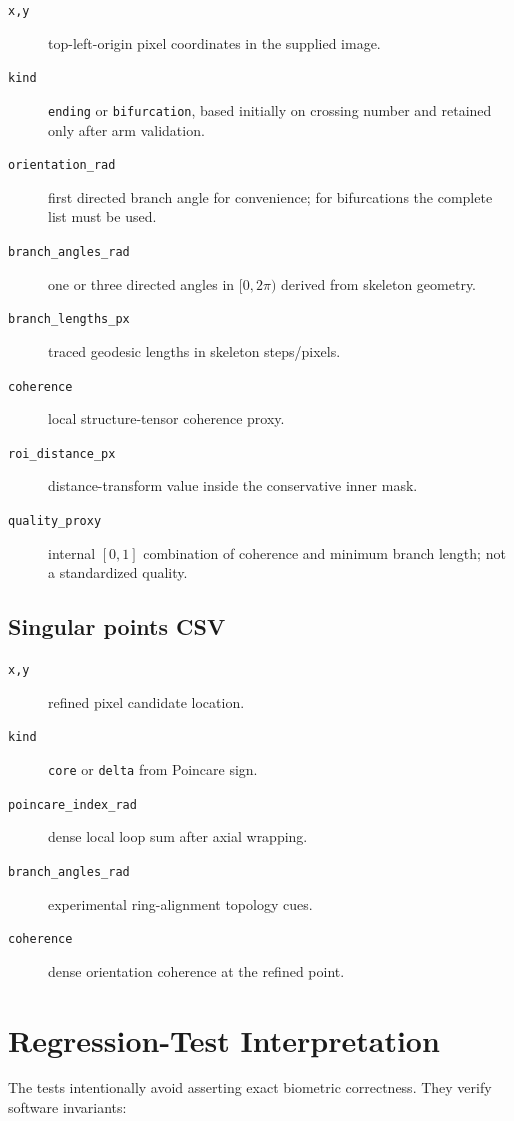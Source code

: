 \documentclass[11pt]{article}
\begin{document}
\begin{description}
  \item[\texttt{x,y}] top-left-origin pixel coordinates in the supplied image.
  \item[\texttt{kind}] \texttt{ending} or \texttt{bifurcation}, based initially on crossing number and retained only after arm validation.
  \item[\texttt{orientation\_rad}] first directed branch angle for convenience; for bifurcations the complete list must be used.
  \item[\texttt{branch\_angles\_rad}] one or three directed angles in $[0,2\pi)$ derived from skeleton geometry.
  \item[\texttt{branch\_lengths\_px}] traced geodesic lengths in skeleton steps/pixels.
  \item[\texttt{coherence}] local structure-tensor coherence proxy.
  \item[\texttt{roi\_distance\_px}] distance-transform value inside the conservative inner mask.
  \item[\texttt{quality\_proxy}] internal $[0,1]$ combination of coherence and minimum branch length; not a standardized quality.
\end{description}

\subsection{Singular points CSV}

\begin{description}
  \item[\texttt{x,y}] refined pixel candidate location.
  \item[\texttt{kind}] \texttt{core} or \texttt{delta} from Poincare sign.
  \item[\texttt{poincare\_index\_rad}] dense local loop sum after axial wrapping.
  \item[\texttt{branch\_angles\_rad}] experimental ring-alignment topology cues.
  \item[\texttt{coherence}] dense orientation coherence at the refined point.
\end{description}

\section{Regression-Test Interpretation}

The tests intentionally avoid asserting exact biometric correctness. They verify software invariants:
\end{document}
